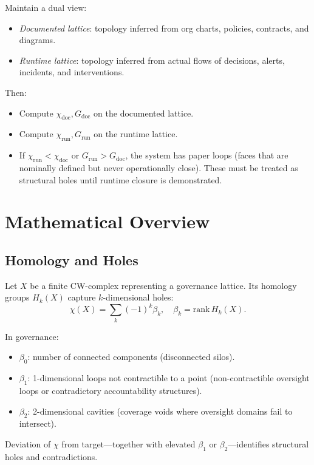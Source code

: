 \documentclass[11pt]{article}
\begin{document}
Maintain a dual view:
\begin{itemize}
  \item \emph{Documented lattice}: topology inferred from org charts, policies, contracts, and diagrams.
  \item \emph{Runtime lattice}: topology inferred from actual flows of decisions, alerts, incidents, and interventions.
\end{itemize}

Then:
\begin{itemize}
  \item Compute \(\chi_{\text{doc}}, G_{\text{doc}}\) on the documented lattice.
  \item Compute \(\chi_{\text{run}}, G_{\text{run}}\) on the runtime lattice.
  \item If \(\chi_{\text{run}} < \chi_{\text{doc}}\) or \(G_{\text{run}} > G_{\text{doc}}\), the system has paper loops (faces that are nominally defined but never operationally close). These must be treated as structural holes until runtime closure is demonstrated.
\end{itemize}

\section{Mathematical Overview}

\subsection{Homology and Holes}

Let \(X\) be a finite CW-complex representing a governance lattice. Its homology groups \(H_k(X)\) capture \(k\)-dimensional holes:
\[
\chi(X) = \sum_{k} (-1)^k \beta_k, \quad \beta_k = \text{rank}\,H_k(X).
\]

In governance:
\begin{itemize}
  \item \(\beta_0\): number of connected components (disconnected silos).
  \item \(\beta_1\): 1-dimensional loops not contractible to a point (non-contractible oversight loops or contradictory accountability structures).
  \item \(\beta_2\): 2-dimensional cavities (coverage voids where oversight domains fail to intersect).
\end{itemize}

Deviation of \(\chi\) from target---together with elevated \(\beta_1\) or \(\beta_2\)---identifies structural holes and contradictions.
\end{document}

